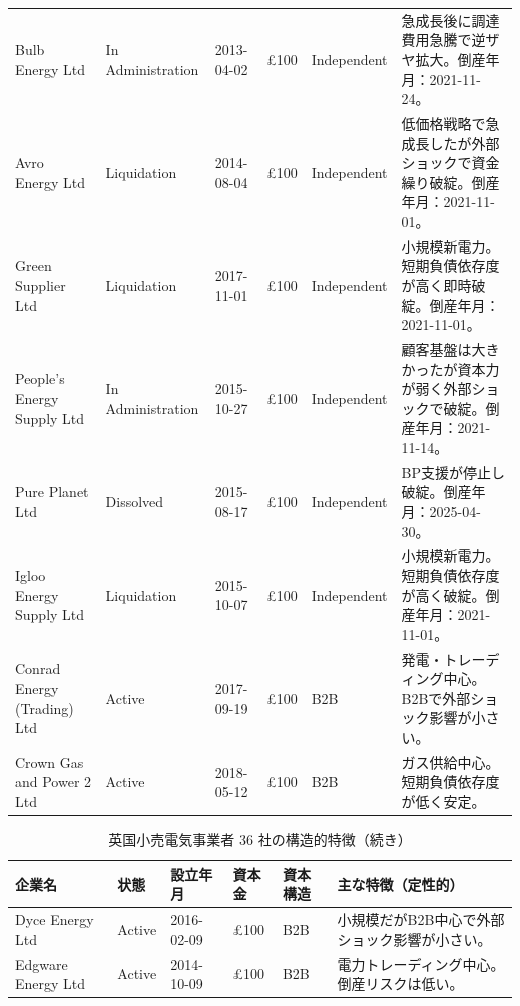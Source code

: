\begin{landscape}
\begin{table}[H]
\begin{tabular}{p{3.2cm}p{1.4cm}p{1.8cm}p{1.8cm}p{2.2cm}p{10cm}}
Bulb Energy Ltd & In Administration & 2013-04-02 & £100 & Independent &
急成長後に調達費用急騰で逆ザヤ拡大。倒産年月：2021-11-24。 \\

Avro Energy Ltd & Liquidation & 2014-08-04 & £100 & Independent &
低価格戦略で急成長したが外部ショックで資金繰り破綻。倒産年月：2021-11-01。 \\

Green Supplier Ltd & Liquidation & 2017-11-01 & £100 & Independent &
小規模新電力。短期負債依存度が高く即時破綻。倒産年月：2021-11-01。 \\

People's Energy Supply Ltd & In Administration & 2015-10-27 & £100 & Independent &
顧客基盤は大きかったが資本力が弱く外部ショックで破綻。倒産年月：2021-11-14。 \\

Pure Planet Ltd & Dissolved & 2015-08-17 & £100 & Independent &
BP支援が停止し破綻。倒産年月：2025-04-30。 \\

Igloo Energy Supply Ltd & Liquidation & 2015-10-07 & £100 & Independent &
小規模新電力。短期負債依存度が高く破綻。倒産年月：2021-11-01。 \\

Conrad Energy (Trading) Ltd & Active & 2017-09-19 & £100 & B2B &
発電・トレーディング中心。B2Bで外部ショック影響が小さい。 \\

Crown Gas and Power 2 Ltd & Active & 2018-05-12 & £100 & B2B &
ガス供給中心。短期負債依存度が低く安定。 \\

\bottomrule
\end{tabular}
\end{table}

\begin{table}[H]
\centering
\footnotesize
\caption{英国小売電気事業者 36 社の構造的特徴（続き）}

\begin{tabular}{p{3.2cm}p{1.4cm}p{1.8cm}p{1.8cm}p{2.2cm}p{10cm}}
\toprule
企業名 & 状態 & 設立年月 & 資本金 & 資本構造 & 主な特徴（定性的） \\
\midrule

Dyce Energy Ltd & Active & 2016-02-09 & £100 & B2B &
小規模だがB2B中心で外部ショック影響が小さい。 \\

Edgware Energy Ltd & Active & 2014-10-09 & £100 & B2B &
電力トレーディング中心。倒産リスクは低い。 \\


\end{tabular}
\end{table}
\end{landscape}
